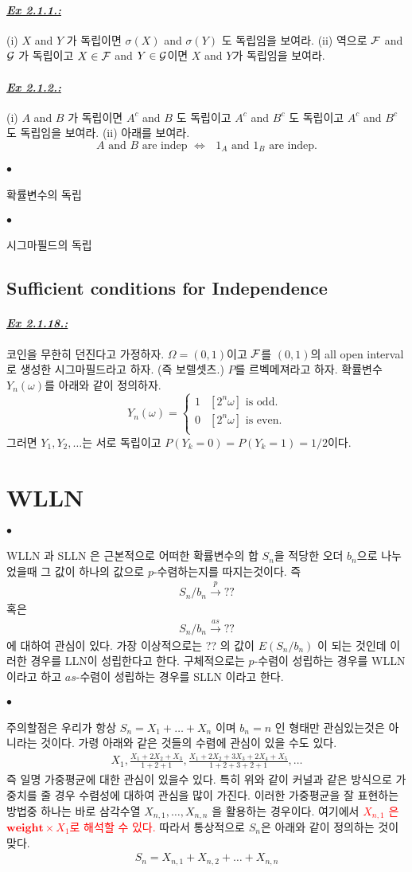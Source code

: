 \documentclass[12pt,oneside,english,a4paper]{article}
\def\ck{\paragraph{\Large$\bullet$}\Large}
\newcommand{\para}[1]{\paragraph{\Large\it\underline{\textbf{#1:}}}\Large}
\begin{document}
\para{Ex 2.1.1.} (i) $X$ and $Y$ 가 독립이면 $\sigma(X)$ and $\sigma(Y)$ 도 독립임을 보여라. (ii) 역으로 ${\cal F}$ and ${\cal G}$ 가 독립이고 $X\in {\cal F}$ and $Y\in{\cal G}$이면 $X$ and $Y$가 독립임을 보여라. 

\para{Ex 2.1.2.} (i) $A$ and $B$ 가 독립이면 $A^c$ and $B$ 도 독립이고 $A^c$ and $B^c$ 도 독립이고 $A^c$ and $B^c$ 도 독립임을 보여라. (ii) 아래를 보여라. 
\[
\mbox{$A$ and $B$ are indep $\Longleftrightarrow$ $1_A$ and $1_B$ are indep.}
\]

\ck 확률변수의 독립

\ck 시그마필드의 독립 

\subsection{Sufficient conditions for Independence}

\para{Ex 2.1.18.} 코인을 무한히 던진다고 가정하자. $\Omega=(0,1)$이고 ${\cal F}$를 $(0,1)$의 all open interval로 생성한 시그마필드라고 하자. (즉 보렐셋츠.) $P$를 르벡메져라고 하자. 확률변수 $Y_n(\omega)$를 아래와 같이 정의하자. 
\[
Y_n(\omega)=\begin{cases}
1  & [2^n\omega] \mbox{ is odd.} \\
0  & [2^n\omega] \mbox{ is even.} \\
\end{cases}
\]
그러면 $Y_1,Y_2,\dots$는 서로 독립이고 $P(Y_k=0)=P(Y_k=1)=1/2$이다. 

\section{WLLN}

\ck WLLN 과 SLLN 은 근본적으로 어떠한 확률변수의 합 $S_n$을 적당한 오더 $b_n$으로 나누었을때 그 값이 하나의 값으로 $p$-수렴하는지를 따지는것이다. 즉 
\begin{align*}
S_n / b_n \overset{p}{\to} ??
\end{align*}
혹은 
\begin{align*}
S_n / b_n \overset{as}{\to} ??
\end{align*}
에 대하여 관심이 있다. 가장 이상적으로는 ?? 의 값이 $E(S_n/b_n)$ 이 되는 것인데 이러한 경우를 LLN이 성립한다고 한다. 구체적으로는 $p$-수렴이 성립하는 경우를 WLLN 이라고 하고 $as$-수렴이 성립하는 경우를 SLLN 이라고 한다. 

\ck 주의할점은 우리가 항상 $S_n=X_1+\dots+X_n$ 이며 $b_n=n$ 인 형태만 관심있는것은 아니라는 것이다. 가령 아래와 같은 것들의 수렴에 관심이 있을 수도 있다. 
\begin{align*}
X_1, \frac{X_1+2 X_2+X_3}{1+2+1}, \frac{X_1+2X_2+3X_3+2X_4+X_5}{1+2+3+2+1}, \dots 
\end{align*}
즉 일명 가중평균에 대한 관심이 있을수 있다. 특히 위와 같이 커널과 같은 방식으로 가중치를 줄 경우 수렴성에 대하여 관심을 많이 가진다. 이러한 가중평균을 잘 표현하는 방법중 하나는 바로 삼각수열 $X_{n,1},\dots,X_{n,n}$ 을 활용하는 경우이다. 여기에서 \textcolor{red}{$X_{n,1}$ 은 $\textbf{weight} \times X_1$로 해석할 수 있다.} 따라서 통상적으로 $S_n$은 아래와 같이 정의하는 것이 맞다. 
\begin{align*}
S_n=X_{n,1}+X_{n,2}+\dots+X_{n,n}
\end{align*}
\end{document}
